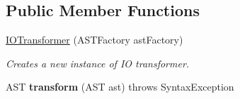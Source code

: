 \subsection*{Public Member Functions}
\begin{DoxyCompactItemize}
\item 
\hyperlink{classedu_1_1udel_1_1cis_1_1vsl_1_1civl_1_1transform_1_1IF_1_1IOTransformer_a33978fbb086d9c8c2890400724b86d71}{I\+O\+Transformer} (A\+S\+T\+Factory ast\+Factory)
\begin{DoxyCompactList}\small\item\em Creates a new instance of I\+O transformer. \end{DoxyCompactList}\item 
\hypertarget{classedu_1_1udel_1_1cis_1_1vsl_1_1civl_1_1transform_1_1IF_1_1IOTransformer_aa9bd88ab598f8782d4778b5f5262ef16}{}A\+S\+T {\bfseries transform} (A\+S\+T ast)  throws Syntax\+Exception \label{classedu_1_1udel_1_1cis_1_1vsl_1_1civl_1_1transform_1_1IF_1_1IOTransformer_aa9bd88ab598f8782d4778b5f5262ef16}

\end{DoxyCompactItemize}
